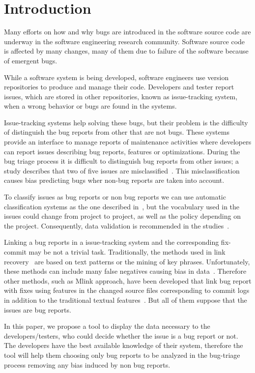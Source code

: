 \documentclass[ifip]{svmult}
\begin{document}
\section{Introduction}
\label{sec:1}

Many efforts on how and why bugs are introduced in the software source code are underway in the software engineering research community. Software source code is affected by many changes, many of them due to failure of the software because of emergent bugs.

While a software system is being developed, software engineers use version repositories to produce and manage their code. Developers and tester report issues, which are stored in other repositories, known as issue-tracking system, when a wrong behavior or bugs are found in the systems.

Issue-tracking systems help solving these bugs, but their problem is the difficulty of distinguish the bug reports from other that are not bugs. These systems provide an interface to manage reports of maintenance activities where developers can report issues describing bug reports, features or optimizations. During the bug triage process it is difficult to distinguish bug reports from other issues; a study describes that two of five issues are misclassified~\cite{Herzig}. This misclassification causes bias predicting bugs wher non-bug reports are taken into account.

To classify issues as bug reports or non bug reports we can use automatic classification systems as the one described in~\cite{Antoniol}, but the vocabulary used in the issues could change from project to project, as well as the policy depending on the project. Consequently, data validation is recommended in the studies~\cite{Herzig}.

Linking a bug reports in a issue-tracking system and the corresponding fix-commit may be not a trivial task. Traditionally, the methods used in link recovery~\cite{Zimmermann, Thomas} are based on text patterns or the mining of key phrases. Unfortunately, these methods can include  many false negatives causing bias in data~\cite{Bird, NguyenTH}. Therefore other methods, such as Mlink approach, have been developed that link bug report with fixes using features in the changed source files corresponding to commit logs in addition to the traditional textual features~\cite{Nguyen}. But all of them suppose that the issues are bug reports.

In this paper, we propose a tool to display the data necessary to the developers/testers, who could decide whether the issue is a bug report or not. The developers have the best available knowledge of their system, therefore the tool will help them choosing only bug reports to be analyzed in the bug-triage process removing any bias induced by non bug reports.
\end{document}
